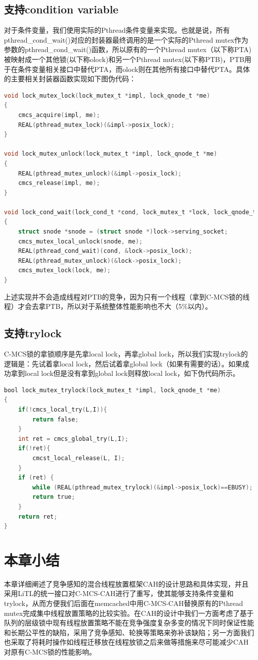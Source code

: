 \subsection{支持condition variable}
对于条件变量，我们使用实际的Pthread条件变量来实现。也就是说，所有pthread\_cond\_wait()对应的封装器最终调用的是一个实际的Pthread mutex作为参数的pthread\_cond\_wait()函数，所以原有的一个Pthread mutex（以下称PTA)被映射成一个其他锁(以下称olock)和另一个Pthread mutex(以下称PTB)，PTB用于在条件变量相关接口中替代PTA，而olock则在其他所有接口中替代PTA。具体的主要相关封装器函数实现如下图伪代码：
\begin{lstlisting}[language={C}, caption={在C-MCS锁中支持体条件变量}]
void lock_mutex_lock(lock_mutex_t *impl, lock_qnode_t *me)
{
    cmcs_acquire(impl, me);
    REAL(pthread_mutex_lock)(&impl->posix_lock);
}

void lock_mutex_unlock(lock_mutex_t *impl, lock_qnode_t *me)
{
    REAL(pthread_mutex_unlock)(&impl->posix_lock);
    cmcs_release(impl, me);
}

void lock_cond_wait(lock_cond_t *cond, lock_mutex_t *lock, lock_qnode_t *me)
{
    struct snode *snode = (struct snode *)lock->serving_socket;
    cmcs_mutex_local_unlock(snode, me);
    REAL(pthread_cond_wait)(cond, &lock->posix_lock);
    REAL(pthread_mutex_unlock)(&lock->posix_lock); 
    cmcs_mutex_lock(lock, me);
}
\end{lstlisting}
上述实现并不会造成线程对PTB的竞争，因为只有一个线程（拿到C-MCS锁的线程）才会去拿PTB，所以对于系统整体性能影响也不大（5\%以内）\cite{guiroux2016multicore}。

\subsection{支持trylock}
C-MCS锁的拿锁顺序是先拿local lock，再拿global lock，所以我们实现trylock的逻辑是：先试着拿local lock，然后试着拿global lock（如果有需要的话）。如果成功拿到local lock但是没有拿到global lock则释放local lock，如下伪代码所示。
\begin{lstlisting}[language={C}, caption={在C-MCS锁中支持trylock}]
bool lock_mutex_trylock(lock_mutex_t *impl, lock_qnode_t *me)
{
    if(!cmcs_local_try(L,I)){
        return false;
    }
    int ret = cmcs_global_try(L,I);
    if(!ret){
        cmcst_local_release(L, I);
    }
    if (ret) { 
        while (REAL(pthread_mutex_trylock)(&impl->posix_lock)==EBUSY);
        return true;
    }
    return ret;
}

\end{lstlisting}

\section{本章小结}
本章详细阐述了竞争感知的混合线程放置框架CAH的设计思路和具体实现，并且采用LiTL的统一接口对C-MCS-CAH进行了重写，使其能够支持条件变量和trylock，从而方便我们后面在memcached中用C-MCS-CAH替换原有的Pthread mutex完成集中线程放置策略的比较实验。在CAH的设计中我们一方面考虑了基于队列的层级锁中现有线程放置策略不能在竞争强度复杂多变的情况下同时保证性能和长期公平性的缺陷，采用了竞争感知、轮换等策略来弥补该缺陷；另一方面我们也采取了将耗时操作如线程迁移放在线程放锁之后来做等措施来尽可能减少CAH对原有C-MCS锁的性能影响。
